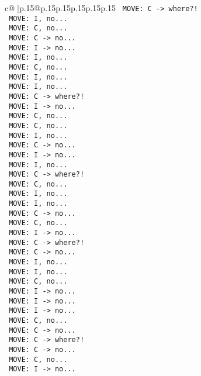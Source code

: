 \documentclass{article}
\begin{document}
{\begin{supertabular}{c@{$\;$}|p{.15\linewidth}@{}p{.15\linewidth}p{.15\linewidth}p{.15\linewidth}p{.15\linewidth}p{.15\linewidth}}
{{{\texttt{ MOVE: C {-}> where?!} \\
\texttt{ MOVE: I, no...} \\
\texttt{ MOVE: C, no...} \\
\texttt{ MOVE: C {-}> no...} \\
\texttt{ MOVE: I {-}> no...} \\
\texttt{ MOVE: I, no...} \\
\texttt{ MOVE: C, no...} \\
\texttt{ MOVE: I, no...} \\
\texttt{ MOVE: I, no...} \\
\texttt{ MOVE: C {-}> where?!} \\
\texttt{ MOVE: I {-}> no...} \\
\texttt{ MOVE: C, no...} \\
\texttt{ MOVE: C, no...} \\
\texttt{ MOVE: I, no...} \\
\texttt{ MOVE: C {-}> no...} \\
\texttt{ MOVE: I {-}> no...} \\
\texttt{ MOVE: I, no...} \\
\texttt{ MOVE: C {-}> where?!} \\
\texttt{ MOVE: C, no...} \\
\texttt{ MOVE: I, no...} \\
\texttt{ MOVE: I, no...} \\
\texttt{ MOVE: C {-}> no...} \\
\texttt{ MOVE: C, no...} \\
\texttt{ MOVE: I {-}> no...} \\
\texttt{ MOVE: C {-}> where?!} \\
\texttt{ MOVE: C {-}> no...} \\
\texttt{ MOVE: I, no...} \\
\texttt{ MOVE: I, no...} \\
\texttt{ MOVE: C, no...} \\
\texttt{ MOVE: I {-}> no...} \\
\texttt{ MOVE: I {-}> no...} \\
\texttt{ MOVE: I {-}> no...} \\
\texttt{ MOVE: C, no...} \\
\texttt{ MOVE: C {-}> no...} \\
\texttt{ MOVE: C {-}> where?!} \\
\texttt{ MOVE: C {-}> no...} \\
\texttt{ MOVE: C, no...} \\
\texttt{ MOVE: I {-}> no...} \\
}}}
\end{supertabular}}
\end{document}
